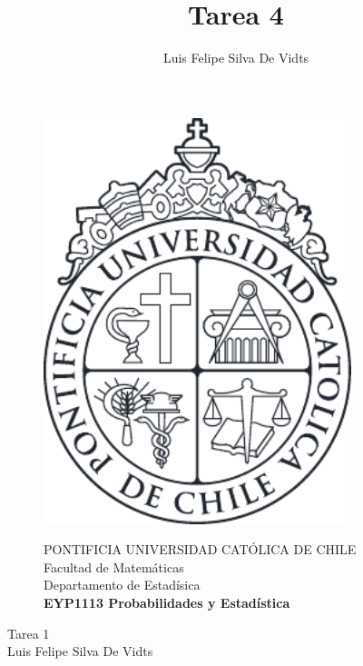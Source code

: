 \documentclass{article}
\title{Tarea 4\\}
\author{Luis Felipe Silva De Vidts}
\begin{document}
\begin{figure}
\begin{minipage}{2.5cm}
\includegraphics[width=0.8\textwidth]{./figures/LogoUC-BN}
\end{minipage}
\begin{minipage}{14.5cm}
\vspace{4mm}
{\sc PONTIFICIA UNIVERSIDAD CAT\'OLICA DE CHILE}\\
Facultad de Matemáticas\\
Departamento de Estadísica\\
{\bf EYP1113 Probabilidades y Estadística}\\
\vspace{0mm}
\hrulefill
\end{minipage}
\end{figure}
\phantom{""}
\vspace{-5mm}
\normalsize
\begin{center}
\Huge Tarea 1\\
\normalsize Luis Felipe Silva De Vidts
\end{center}
\end{document}
